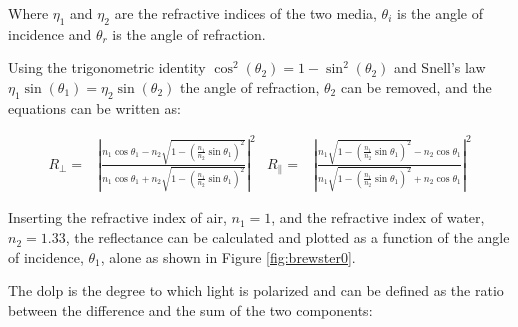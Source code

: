 Where  $\eta_1$ and $\eta_2$ are the refractive indices of the two media,
$\theta_i$ is the angle of incidence and $\theta_r$ is the angle of refraction.

Using the trigonometric identity $ \cos^2{\left(\theta_2 \right)} = 1- \sin^2{\left(\theta_2 \right)}$ and Snell's law $\eta_1 \sin{\left(\theta_1 \right)} = \eta_2 \sin{\left(\theta_2 \right)}$ the angle of refraction, $\theta_2$ can be removed, and the equations can be written as:

\begin{align}
    R_\perp =         & \left|{\frac {n_{1}\cos \theta _1-n_{2}{\sqrt {1-\left({\frac {n_{1}}{n_{2}}}\sin \theta _1\right)^{2}}}}{n_{1}\cos \theta _1+n_{2}{\sqrt {1-\left({\frac {n_{1}}{n_{2}}}\sin \theta _1\right)^{2}}}}}\right|^{2}
                      &
    R_\parallel     = & \left|{\frac {n_{1}{\sqrt {1-\left({\frac {n_{1}}{n_{2}}}\sin \theta _1\right)^{2}}}-n_{2}\cos \theta _1}{n_{1}{\sqrt {1-\left({\frac {n_{1}}{n_{2}}}\sin \theta _1\right)^{2}}}+n_{2}\cos \theta _1}}\right|^{2}
\end{align}


Inserting the refractive index of air, $n_1 = 1$, and the refractive index of water, $n_2 = 1.33$, the reflectance can be calculated and plotted as a function of the angle of incidence, $\theta_1$, alone as shown in Figure \ref{fig:brewster0}.

The \gls{dolp} is the degree to which light is polarized and can be defined as the ratio between the difference and the sum of the two components:

